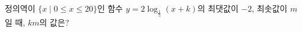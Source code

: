 정의역이 $\{x \mid 0\le x\le 20\}$인 함수 $y=2\log_{\frac{1}{5}} (x+k)$의 최댓값이 $-2$, 최솟값이 $m$일 때, $km$의 값은? 

